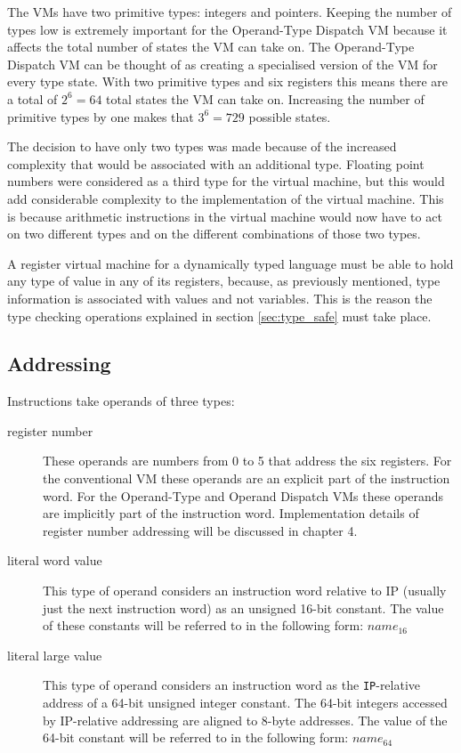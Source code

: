 \documentclass[english,a4paper,12pt]{report}
\begin{document}
The VMs have two primitive types: integers and pointers. Keeping the
number of types low is extremely important for the Operand-Type
Dispatch VM because it affects the total number of states the VM can
take on. The Operand-Type Dispatch VM can be thought of as creating a
specialised version of the VM for every type state. With two primitive
types and six registers this means there are a total of $2^6 = 64$
total states the VM can take on. Increasing the number of primitive
types by one makes that $3^6 = 729$ possible states.

The decision to have only two types was made because of the increased
complexity that would be associated with an additional type. Floating
point numbers were considered as a third type for the virtual machine,
but this would add considerable complexity to the implementation of
the virtual machine. This is because arithmetic instructions in the
virtual machine would now have to act on two different types and on
the different combinations of those two types.

A register virtual machine for a dynamically typed language must be
able to hold any type of value in any of its registers, because, as
previously mentioned, type information is associated with values and
not variables. This is the reason the type checking operations
explained in section \ref{sec:type_safe} must take place. 

\subsection{Addressing}
Instructions take operands of three types: 
\begin{description}
\item[register number] These operands are numbers from 0 to 5 that
  address the six registers. For the conventional VM these operands
  are an explicit part of the instruction word. For the Operand-Type
  and Operand Dispatch VMs these operands are implicitly part of the
  instruction word. Implementation details of register number
  addressing will be discussed in chapter 4. %
\item[literal word value] This type of operand considers an instruction
  word relative to IP (usually just the next instruction word) as an
  unsigned 16-bit constant. The value of these constants will be
  referred to in the following form: $name_{16}$
\item[literal large value] This type of operand considers an
  instruction word as the \verb|IP|-relative address of a 64-bit
  unsigned integer constant. The 64-bit integers accessed by
  IP-relative addressing are aligned to 8-byte addresses. The value of
  the 64-bit constant will be referred to in the following form:
  $name_{64}$
\end{description}
\end{document}
